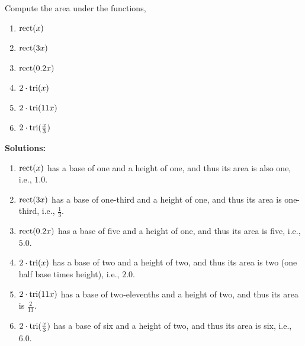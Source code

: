 \bigskip
\begin{example}
    Compute the area under the functions,
    \begin{enumerate}
\renewcommand{\labelenumi}{(\alph{enumi})}
\setlength{\itemsep}{.2cm}
\item $\mathrm{rect}(x)$
\item $\mathrm{rect}(3x)$
\item $\mathrm{rect}(0.2 x)$
\item $2 \cdot \mathrm{tri}(x)$
\item $2 \cdot \mathrm{tri}(11x)$
\item $2 \cdot \mathrm{tri}(\frac{x}{3})$
\end{enumerate}
\end{example}
\textbf{Solutions:}

    \begin{enumerate}
\renewcommand{\labelenumi}{(\alph{enumi})}
\setlength{\itemsep}{.2cm}
\item $\mathrm{rect}(x)$ has a base of one and a height of one, and thus its area is also one, i.e., $1.0$.
\item $\mathrm{rect}(3x)$ has a base of one-third and a height of one, and thus its area is one-third, i.e., $\frac{1}{3}$.
\item $\mathrm{rect}(0.2 x)$ has a base of five and a height of one, and thus its area is five, i.e., $5.0$.
\item $2 \cdot \mathrm{tri}(x)$ has a base of two and a height of two, and thus its area is two (one half base times height), i.e., $2.0$.
\item $2 \cdot \mathrm{tri}(11x)$ has a base of two-elevenths and a height of two, and thus its area is $\frac{2}{11}$.
\item $2 \cdot \mathrm{tri}(\frac{x}{3})$ has a base of six and a height of two, and thus its area is six, i.e., $6.0$.
\end{enumerate}


\Qed


